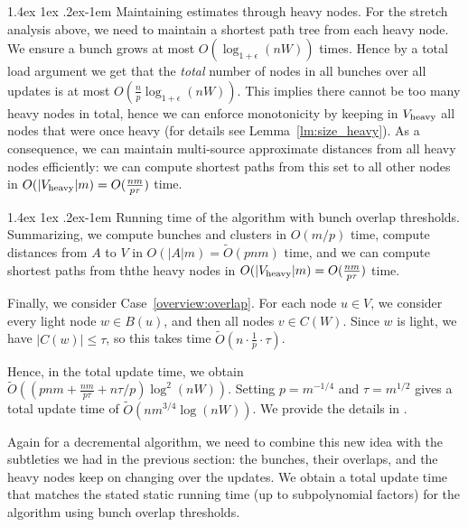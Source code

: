 \documentclass[11pt]{article}
\makeatletter
\theoremstyle{definition}
\theoremstyle{remark}
\renewcommand{\paragraph}{%
  \@startsection{paragraph}{4}%
  {\z@}{1.4ex \@plus 1ex \@minus .2ex}{-1em}%
  {\normalfont\normalsize\bfseries}%
}
\makeatother
\begin{document}
\paragraph{Maintaining estimates through heavy nodes.}
For the stretch analysis above, we need to maintain a shortest path tree from each heavy node. We ensure a bunch grows at most $O(\log_{1+\epsilon}(nW))$ times. Hence by a total load argument we get that the \emph{total} number of nodes in all bunches over all updates is at most $O(\tfrac{n}{p}\log_{1+\epsilon}(nW))$. This implies there cannot be too many heavy nodes in total, hence we can enforce monotonicity by keeping in $V_{\rm{heavy}}$ all nodes that were once heavy (for details see Lemma~\ref{lm:size_heavy}). As a consequence, we can maintain multi-source approximate distances from all heavy nodes efficiently: we can compute shortest paths from this set to all other nodes in $O(|V_{\rm{heavy}}|m)=O(\tfrac{nm}{p\tau})$ time.


\paragraph{Running time of the algorithm with bunch overlap thresholds.}
Summarizing, we compute bunches and clusters in $O(m/p)$ time, compute distances from $A$ to $V$ in $O(|A|m)=\tilde O(pnm)$ time, and we can compute shortest paths from ththe heavy nodes in $O(|V_{\rm{heavy}}|m)=O(\tfrac{nm}{p\tau})$ time.


Finally, we consider Case~\ref{overview:overlap}. For each node $u\in V$, we consider every light node $w\in B(u)$, and then all nodes $v\in C(W)$. Since $w$ is light, we have $|C(w)|\leq \tau$, so this takes time $\tilde O(n\cdot \tfrac{1}{p}\cdot \tau)$.  

Hence, in the total update time, we obtain $\tilde O((pnm+\tfrac{nm}{p\tau}+n\tau/p)\log^2(nW))$. Setting $p=m^{-1/4}$ and $\tau = m^{1/2}$ gives a total update time of $\tilde O(nm^{3/4}\log(nW))$. We provide the details in .

Again for a decremental algorithm, we need to combine this new idea with the subtleties we had in the previous section: the bunches, their overlaps, and the heavy nodes keep on changing over the updates. We obtain a total update time that matches the stated static running time (up to subpolynomial factors) for the algorithm using bunch overlap thresholds. 

 
\end{document}

